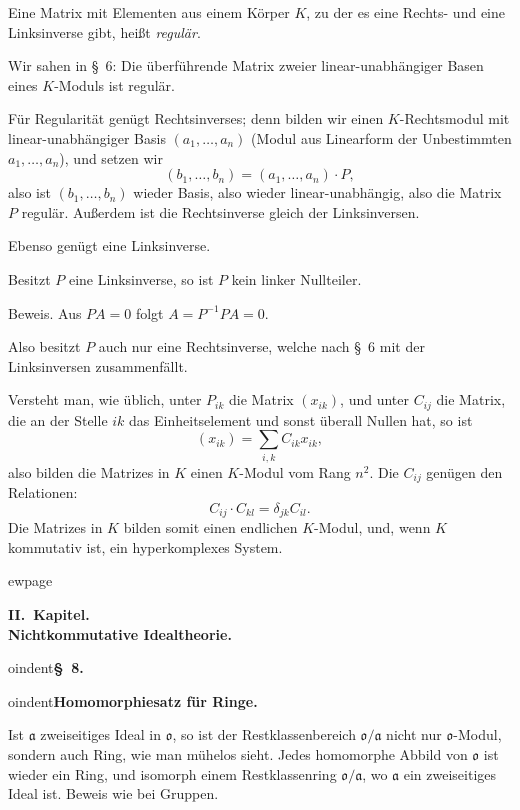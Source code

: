 \documentclass[12pt,a4paper]{article}
\newcommand{\ideala}{\mathfrak{a}}
\theoremstyle{definition}
\begin{document}
Eine Matrix mit Elementen aus einem K\"orper $K$, zu der es eine
Rechts- und eine Linksinverse gibt, hei\ss t \textit{regul\"ar}.

Wir sahen in \S~6: Die \"uberf\"uhrende Matrix zweier
linear-unabh\"angiger Basen eines $K$-Moduls ist regul\"ar.

F\"ur Regularit\"at gen\"ugt Rechtsinverses; denn bilden wir einen
$K$-Rechtsmodul mit linear-unabh\"angiger Basis $(a_1, \dots, a_n)$
(Modul aus Linearform der Unbestimmten $a_1, \dots, a_n$), und setzen
wir
\[
(b_1, \dots, b_n) = (a_1, \dots, a_n) \cdot P,
\]
also ist $(b_1, \dots, b_n)$ wieder Basis, also wieder
linear-unabh\"angig, also die Matrix $P$ regul\"ar. Au\ss erdem ist die
Rechtsinverse gleich der Linksinversen.

Ebenso gen\"ugt eine Linksinverse.

Besitzt $P$ eine Linksinverse, so ist $P$ kein linker Nullteiler.

Beweis. Aus $PA = 0$ folgt $A = P^{-1}PA = 0$.

Also besitzt $P$ auch nur eine Rechtsinverse, welche nach \S~6 mit der
Linksinversen zusammenf\"allt.

Versteht man, wie \"ublich, unter $P_{ik}$ die Matrix $(x_{ik})$, und
unter $C_{ij}$ die Matrix, die an der Stelle $ik$ das Einheitselement
und sonst \"uberall Nullen hat, so ist
\[
(x_{ik}) = \sum_{i,k} C_{ik} x_{ik},
\]
also bilden die Matrizes in $K$ einen $K$-Modul vom Rang $n^2$. Die
$C_{ij}$ gen\"ugen den Relationen:
\[
C_{ij} \cdot C_{kl} = \delta_{jk} C_{il}.
\]
Die Matrizes in $K$ bilden somit einen endlichen $K$-Modul, und, wenn
$K$ kommutativ ist, ein hyperkomplexes System.



ewpage
\setcounter{page}{593}

\begin{center}
\textbf{II.~Kapitel.}\\[0.3em]
\textbf{Nichtkommutative Idealtheorie.}
\end{center}

\medskip



oindent\textbf{\S~8.}



oindent\textbf{Homomorphiesatz f\"ur Ringe.}

Ist $\ideala$ zweiseitiges Ideal in $\mathfrak{o}$, so ist der
Restklassenbereich $\mathfrak{o}/\ideala$ nicht nur
$\mathfrak{o}$-Modul, sondern auch Ring, wie man m\"uhelos sieht.
Jedes homomorphe Abbild von $\mathfrak{o}$ ist wieder ein Ring, und
isomorph einem Restklassenring $\mathfrak{o}/\ideala$, wo $\ideala$
ein zweiseitiges Ideal ist. Beweis wie bei Gruppen.
\end{document}
